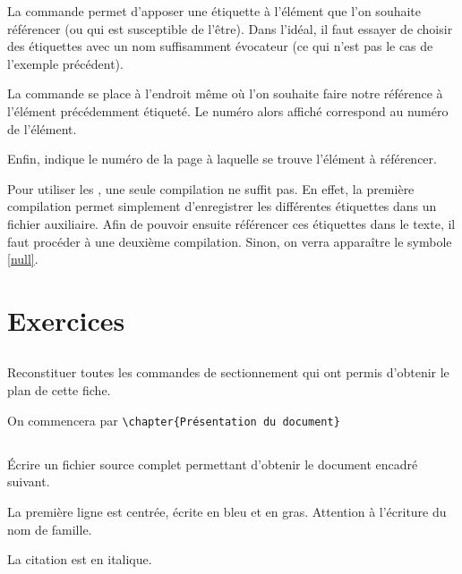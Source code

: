 La commande  permet d'apposer une étiquette à l'élément que l'on souhaite référencer (ou qui est susceptible de l'être). Dans l'idéal, il faut essayer de choisir des étiquettes avec un nom suffisamment évocateur (ce qui n'est pas le cas de l'exemple précédent).\par
La commande  se place à l'endroit même où l'on souhaite faire notre référence à l'élément précédemment étiqueté. Le numéro alors affiché correspond au numéro de l'élément.\par
Enfin,  indique le numéro de la page à laquelle se trouve l'élément à référencer.

\begin{info}
    Pour utiliser les , une seule compilation ne suffit pas. En effet, la première compilation permet simplement d'enregistrer les différentes étiquettes dans un fichier auxiliaire. Afin de pouvoir ensuite référencer ces étiquettes dans le texte, il faut procéder à une deuxième compilation. Sinon, on verra apparaître le symbole \ref{null}.
\end{info}

\section{Exercices}

\subsection*{\ExoFiche}
Reconstituer toutes les commandes de sectionnement qui ont permis d'obtenir le plan de cette fiche.\par
On commencera par \verb!\chapter{Présentation du document}!

\subsection*{\ExoFiche}

\'Ecrire un fichier source complet permettant d'obtenir le document encadré suivant.\par
La première ligne est centrée, écrite en bleu et en gras. Attention à l'écriture du nom de famille.\par
La citation est en italique.\par\medskip

